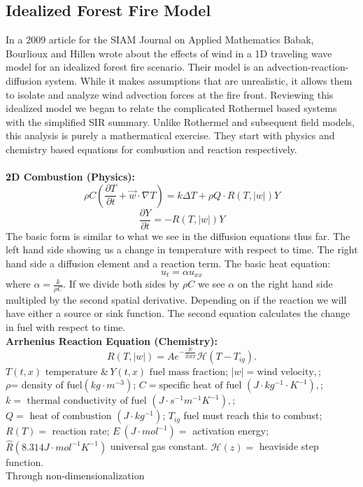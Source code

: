\documentclass{article}
\begin{document}
\subsection{Idealized Forest Fire Model}
In a 2009 article for the SIAM Journal on Applied Mathematics Babak, Bourlioux and Hillen\supercite{babak} wrote about the effects of wind in a 1D traveling wave model for an idealized forest fire scenario.  Their model is an advection-reaction-diffusion system.  While it makes assumptions that are unrealistic, it allows them to isolate and analyze wind advection forces at the fire front. Reviewing this idealized model we began to relate the complicated Rothermel based systems with the simplified SIR summary.   Unlike Rothermel and subsequent field models, this analysis is purely a mathermatical exercise. They start with physics and chemistry based equations for combustion and reaction respectively. \\\\
\textbf{2D Combustion (Physics):}
    $$\rho C\left(\frac{\partial T}{\partial t}+\vec{w}\cdot \nabla T\right)=k\Delta T +\rho Q \cdot R(T,|w|)Y$$
    $$\frac{\partial Y}{\partial t}=-R(T,|w|)Y$$
The basic form is similar to what we see in the diffusion equations thus far.  The left hand side showing us a change in temperature with respect to time.  The right hand side a diffusion element and a reaction term.  
The basic heat equation:
$$u_t=\alpha u_{xx}$$
where $\alpha = \frac{k}{\rho C}$.  If we divide both sides by $\rho C$ we see $\alpha$ on the right hand side multipled by the second spatial derivative.   Depending on if the reaction we will have either a source or sink function.  The second equation calculates the change in fuel with respect to time.\\
\textbf{Arrhenius Reaction Equation (Chemistry):}
    $$R(T,|w|) =Ae^{-\frac{E}{\hat{R}RT}}\mathcal{H}(T-T_{ig}).$$ 
    $T(t,x)\text{ temperature }\&\, Y(t,x)\text{ fuel mass fraction}$; 
    $|w|=\text{wind velocity},$; 
    $\rho \text{= density of fuel}(kg\cdot m^{-3})$; 
    $C=\text{specific heat of fuel }(J\cdot kg^{-1}\cdot K^{-1}),$;  $k=\text{ thermal conductivity of fuel }(J\cdot s^{-1}m^{-1}K^{-1}),$; 
    $Q=\text{ heat of combustion }(J\cdot kg^{-1})$; 
    $T_{ig}$ fuel must reach this to combust; 
    $R(T)=$ reaction rate; $E\ (J\cdot mol^{-1})=$ activation energy; $\hat{R}(8.314J\cdot mol^{-1}K^{-1})$ universal gas constant.  $\mathcal{H}(z)=$ heaviside step function. \\
    Through non-dimensionalization 
\end{document}
